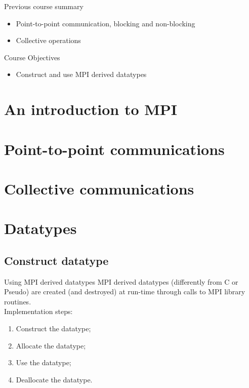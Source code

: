 \documentclass[aspectratio=43]{beamer}
\begin{document}
\cscstitle

\begin{frame}{Previous course summary}
\begin{itemize}
\item Point-to-point communication, blocking and non-blocking
\item Collective operations
\end{itemize}
\end{frame}

\begin{frame}{Course Objectives}
\begin{itemize}
\item Construct and use MPI derived datatypes
\end{itemize}
\end{frame}


\section{An introduction to MPI}
\section{Point-to-point communications}
\section{Collective communications}
\section{Datatypes}


\subsection{Construct datatype}

\begin{frame}[fragile]{Using MPI derived datatypes}
MPI derived datatypes (differently from C or Pseudo) are created (and destroyed) at run-time through calls to MPI library routines.\\
Implementation steps:
\begin{enumerate}
\item Construct the datatype;
\item Allocate the datatype;
\item Use the datatype;
\item Deallocate the datatype.
\end{enumerate}
\end{frame}
\end{document}
